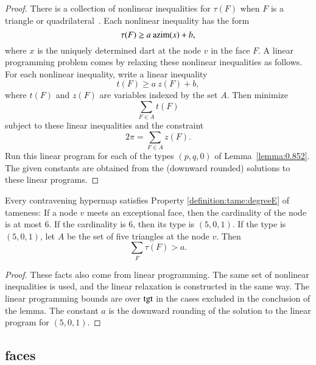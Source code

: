 \begin{proof} There is a collection of nonlinear inequalities
for $\tau(F)$ when $F$ is a triangle or quadrilateral~\cite[FUSDSPJ]{hales:2009:nonlinear}. Each nonlinear inequality has the form
$$\tau(F) \ge a~{\operatorname{azim}}(x) + b,$$
where $x$ is the uniquely determined dart at the node $v$ in the face $F$.  A linear programming problem comes by relaxing these nonlinear inequalities as follows.  For each nonlinear inequality,  write a linear inequality
$$
t(F) \ge a~z(F) + b,
$$
where $t(F)$ and $z(F)$ are variables indexed by the set $A$.
Then  minimize 
$$\sum_{F\in A} t(F)$$
subject to these linear inequalities and the constraint
$$
2\pi = \sum_{F\in A} z(F).
$$
Run this linear program for each of the types $(p,q,0)$ of Lemma~\ref{lemma:0.852}. The given constants are obtained from the (downward rounded) solutions to these linear programs.
\end{proof}

\begin{lemma}\label{lemma:deg5}
Every contravening hypermap satisfies Property
\ref{definition:tame:degreeE} of tameness: If a node $v$ meets an
exceptional face, then the cardinality of the node is at most $6$.
If the cardinality is $6$, then its type is $(5,0,1)$.
If the type is $(5,0,1)$, let $A$ be the set of five triangles at the
node $v$.  Then
$$
\sum_F \tau(F) > a.
$$
\end{lemma}

\begin{proof} These facts also come from linear programming.
The same set of nonlinear inequalities is used, and the linear
relaxation is constructed in the same way.  The linear programming
bounds are over ${\operatorname{tgt}}$ in the cases excluded in the conclusion
of the lemma.  The constant $a$ is the downward rounding of the solution to the linear program for $(5,0,1)$.
\end{proof}

\subsection{faces}



